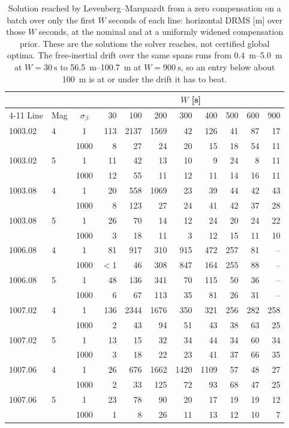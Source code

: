 \documentclass{IEEEtaes}
\begin{document}
\begin{table}[t]
\caption{Solution reached by Levenberg--Marquardt from a zero compensation on a
batch over only the first $W$ seconds of each line: horizontal DRMS [m] over
those $W$ seconds, at the nominal and at a uniformly widened compensation prior.
These are the solutions the solver reaches, not certified global optima. The
free-inertial drift over the same spans runs from \SIrange{0.4}{5.0}{\meter} at
$W=\SI{30}{\second}$ to \SIrange{56.5}{100.7}{\meter} at $W=\SI{900}{\second}$,
so an entry below about \SI{100}{\meter} is at or under the drift it has to beat.}
\label{tab:knee}
\centering
\setlength{\tabcolsep}{3pt}
\begin{tabular}{ll c rrrrrrrr}
\toprule
 & & & \multicolumn{8}{c}{$W$ [s]} \\
\cmidrule(l){4-11}
Line & Mag & $\sigma_{\beta}$ & 30 & 100 & 200 & 300 & 400 & 500 & 600 & 900 \\
\midrule
1003.02 & 4 & 1 & 113 & 2137 & 1569 & 42 & 126 & 41 & 87 & 17 \\
        &   & 1000 & 8 & 27 & 24 & 20 & 15 & 18 & 54 & 11 \\
1003.02 & 5 & 1 & 11 & 42 & 13 & 10 & 9 & 24 & 8 & 11 \\
        &   & 1000 & 12 & 55 & 11 & 12 & 11 & 14 & 16 & 11 \\
1003.08 & 4 & 1 & 20 & 558 & 1069 & 23 & 39 & 44 & 42 & 43 \\
        &   & 1000 & 8 & 123 & 27 & 24 & 41 & 42 & 37 & 28 \\
1003.08 & 5 & 1 & 26 & 70 & 14 & 12 & 24 & 20 & 24 & 22 \\
        &   & 1000 & 3 & 18 & 11 & 3 & 12 & 15 & 11 & 10 \\
1006.08 & 4 & 1 & 81 & 917 & 310 & 915 & 472 & 257 & 81 & -- \\
        &   & 1000 & $<$1 & 46 & 308 & 847 & 164 & 255 & 88 & -- \\
1006.08 & 5 & 1 & 48 & 136 & 341 & 70 & 115 & 50 & 36 & -- \\
        &   & 1000 & 6 & 67 & 113 & 35 & 81 & 26 & 31 & -- \\
1007.02 & 4 & 1 & 136 & 2344 & 1676 & 350 & 321 & 256 & 282 & 258 \\
        &   & 1000 & 2 & 43 & 94 & 51 & 43 & 38 & 63 & 25 \\
1007.02 & 5 & 1 & 13 & 15 & 32 & 34 & 44 & 34 & 60 & 34 \\
        &   & 1000 & 3 & 18 & 22 & 23 & 41 & 37 & 66 & 35 \\
1007.06 & 4 & 1 & 26 & 676 & 1662 & 1420 & 1109 & 57 & 48 & 27 \\
        &   & 1000 & 2 & 33 & 125 & 72 & 93 & 68 & 47 & 25 \\
1007.06 & 5 & 1 & 23 & 78 & 90 & 20 & 17 & 19 & 19 & 12 \\
        &   & 1000 & 1 & 8 & 26 & 11 & 13 & 12 & 10 & 7 \\
\bottomrule
\end{tabular}
\end{table}
\end{document}
